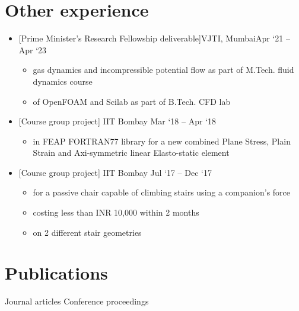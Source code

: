 \documentclass[a4paper,10pt]{article}
\newcommand{\of}{OpenFOAM}
\newcommand{\feap}{FEAP}
\begin{document}
\section{Other experience}
\begin{itemize}
	\item {}[Prime Minister's Research Fellowship deliverable]{VJTI, Mumbai}{Apr `21 -- Apr `23}
	\begin{itemize}
		\item {} gas dynamics and incompressible potential flow as part of M.Tech. fluid dynamics course
		\item {} of \of{} and Scilab as part of B.Tech. CFD lab
	\end{itemize}
	\item {}
	[Course group project]
	{IIT Bombay}
	{Mar `18 -- Apr `18}
	\begin{itemize}
		\item {} in \feap{} FORTRAN77 library for a new combined Plane Stress, Plain Strain and Axi-symmetric linear Elasto-static element
	\end{itemize}
	\item {}
	[Course group project]
	{IIT Bombay}
	{Jul `17 -- Dec `17}
	\begin{itemize}
		\item {} for a passive chair capable of climbing stairs using a companion's force
		\item {} costing less than INR 10,000 within 2 months
		\item {} on 2 different stair geometries
	\end{itemize}
\end{itemize}



\section{Publications}
\nocite{*}
Journal articles
\printbibliography[heading=none, type=article, resetnumbers=true]%
\noindent Conference proceedings
\printbibliography[heading=none, type=inproceedings, resetnumbers=true]
\end{document}
